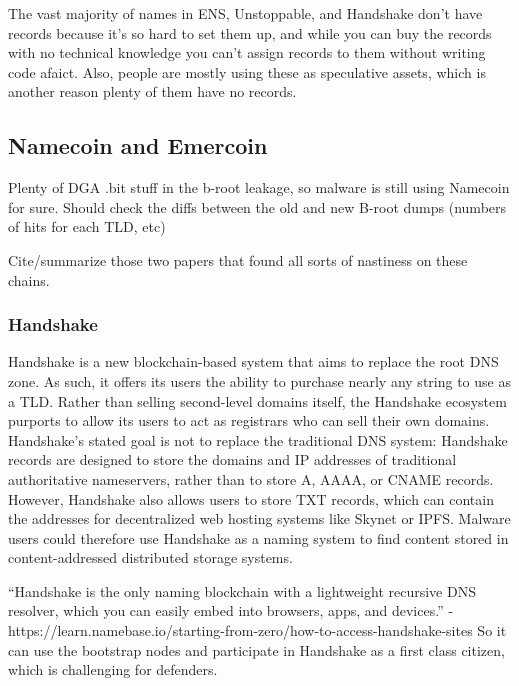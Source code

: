 \documentclass[10pt,sigconf,letterpaper]{acmart}
\begin{document}
The vast majority of names in ENS, Unstoppable, and Handshake 
don't have records because it's so hard to set them up, and 
while you can buy the records with no technical knowledge you 
can't assign records to them without writing code afaict. 
Also, people are mostly using these as speculative assets, 
which is another reason plenty of them have no records.

\subsection{Namecoin and Emercoin}

Plenty of DGA .bit stuff in the b-root leakage, so malware is 
still using Namecoin for sure. Should check the diffs between 
the old and new B-root dumps (numbers of hits for each TLD, 
etc)

Cite/summarize those two papers that found all sorts of 
nastiness on these chains.

\subsubsection{Handshake}

Handshake is a new blockchain-based system that aims to 
replace the root DNS 
zone. As such, it offers its users the ability to purchase 
nearly any string to 
use as a TLD. Rather than selling second-level domains 
itself, the Handshake ecosystem purports to allow its users 
to act as registrars who can sell their own domains. 
Handshake's stated goal is not to replace the traditional DNS 
system: Handshake records are designed to store the domains 
and IP addresses of traditional authoritative nameservers, 
rather than to store A, AAAA, or CNAME records. However, 
Handshake also allows users to store TXT records, which can 
contain the addresses for decentralized web hosting systems 
like Skynet or IPFS. Malware users could therefore use 
Handshake as a naming system to find content stored in 
content-addressed distributed storage systems.

``Handshake is the only naming blockchain with a lightweight 
recursive DNS resolver, which you can easily embed into 
browsers, apps, and devices.'' - 
https://learn.namebase.io/starting-from-zero/how-to-access-handshake-sites
So it can use the bootstrap nodes and participate in 
Handshake as a first class citizen, which is challenging for 
defenders.
\end{document}
